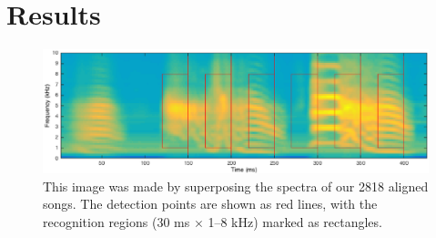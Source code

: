 \documentclass[10pt,letterpaper]{article}
\begin{document}
\section{Results}
\label{sec:results}

\begin{figure}
  \includegraphics[width=\textwidth]{6syllables}
  \caption{This image was made by superposing the spectra of our 2818 aligned songs.  The detection points are shown as red lines, with the recognition regions (30 ms $\times$ 1--8 kHz) marked as rectangles.}
  \label{fig:song}
\end{figure}
\end{document}
